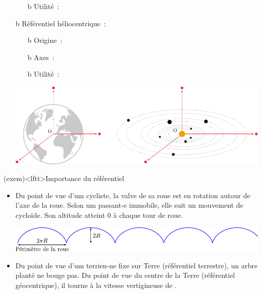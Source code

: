 \documentclass[../../main/main.tex]{subfiles}
\begin{document}
\begin{tcb*}[breakable]
\begin{itemize}
\begin{itemize}
			      \item[b]{Utilité}~: 
		      \end{itemize}
		      \begin{center}
		      \end{center}
		\item[b]{Référentiel héliocentrique}~:
		      \begin{itemize}
			      \item[b]{Origine}~: 
			      \item[b]{Axes}~: 
			      \item[b]{Utilité}~: 
		      \end{itemize}
		      \begin{center}
			      \includegraphics[width=.7\linewidth]{ref_geo-helio}
		      \end{center}
	\end{itemize}
\end{tcb*}

\begin{tcb}[breakable](exem)<lftt>{Importance du référentiel}
	\begin{itemize}
		\item Du point de vue d'um cycliste, la valve de sa roue est en rotation
		      autour de l'axe de la roue. Selon um passant-e immobile, elle suit un
		      mouvement de cycloïde. Son altitude atteint $0$ à chaque tour de roue.
		      \begin{center}
			      \includegraphics[width=\linewidth]{roue}
		      \end{center}
		\item Du point de vue d'um terrien-ne fixe sur Terre (référentiel
		      terrestre), un arbre planté ne bouge pas. Du point de vue du centre de la
		      Terre (référentiel géocentrique), il tourne à la vitesse vertigineuse de
		      .
	\end{itemize}
\end{tcb}
\end{document}
